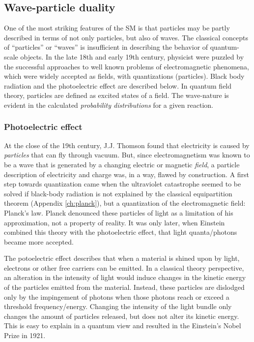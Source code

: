 \subsection{Wave-particle duality}
One of the most striking features of the SM is that particles may be partly described in terms of not only particles, but also of waves. The classical concepts of ``particles'' or ``waves'' is insufficient in describing the behavior of quantum-scale objects. In the late 18th and early 19th century, physicist were puzzled by the successful approaches to well known problems of electromagnetic phenomena, which were widely accepted as fields, with quantizations (particles). Black body radiation and the photoelectric effect are described below. In quantum field theory, particles are defined as excited states of a field. The wave-nature is evident in the calculated \textit{probability distributions} for a given reaction.

\subsubsection{Photoelectric effect}
At the close of the 19th century, J.J. Thomson found that electricity is caused by \textit{particles} that can fly through vacuum. But, since electromagnetism was known to be a wave that is generated by a changing electric or magnetic \textit{field}, a particle description of electricity and charge was, in a way, flawed by construction. 
A first step towards quantization came when the ultraviolet catastrophe seemed to be solved if black-body radiation is not explained by the classical equipartition theorem (Appendix \ref{ch:planck}), but a quantization of the electromagnetic field: Planck's law. Planck denounced these particles of light as a limitation of his approximation, not a property of reality. It was only later, when Einstein combined this theory with the photoelectric effect, that light quanta/photons became more accepted.

The potoelectric effect describes that when a material is shined upon by light, electrons or other free carriers can be emitted. In a classical theory perspective, an alteration in the intensity of light would induce changes in the kinetic energy of the particles emitted from the material. Instead, these particles are dislodged only by the impingement of photons when those photons reach or exceed a threshold frequency/energy. Changing the intensity of the light bundle only changes the amount of particles released, but does not alter its kinetic energy. This is easy to explain in a quantum view and resulted in the Einstein's Nobel Prize in 1921.

